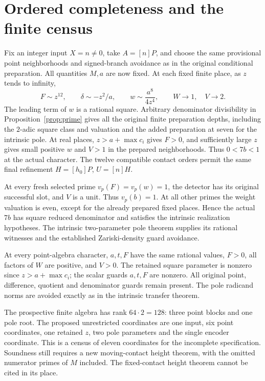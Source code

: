 \documentclass[11pt,a4paper]{article}
\begin{document}
\section{Ordered completeness and the finite census}

Fix an integer input $X=n\ne0$, take $A=[n]P$, and choose the
same provisional point neighborhoods and signed-branch avoidance
as in the original conditional preparation. All quantities $M,a$
are now fixed. At each fixed finite place, as $z$ tends to infinity,
\[
 F\sim z^{12},\qquad \delta\sim-z^2/a,\qquad
 w\sim\frac{a^8}{4z^4},\qquad W\longrightarrow1,\quad
 V\longrightarrow2.
\]
The leading term of $w$ is a rational square. Arbitrary denominator
divisibility in Proposition~\ref{prop:prime} gives all the original
finite preparation depths, including the $2$-adic square class and
valuation and the added preparation at seven for the intrinsic pole.
At real places, $z>a+\max c_i$ gives $F>0$, and sufficiently large
$z$ gives small positive $w$ and $V>1$ in the prepared neighborhoods.
Thus $0<7b<1$ at the actual character. The twelve compatible contact
orders permit the same final refinement $H=[h_0]P$, $U=[n]H$.

At every fresh selected prime $v_p(F)=v_p(w)=1$, the detector has
its original successful slot, and $V$ is a unit. Thus $v_p(b)=1$.
At all other primes the weight valuation is even, except for the
already prepared fixed places. Hence the actual $7b$ has square
reduced denominator and satisfies the intrinsic realization
hypotheses. The intrinsic two-parameter pole theorem supplies
its rational witnesses and the established Zariski-density guard
avoidance.

At every point-algebra character, $a,t,F$ have the same rational
values, $F>0$, all factors of $W$ are positive, and $V>0$.
The retained square parameter is nonzero since $z>a+\max c_i$; the scalar
guards $a,t,F$ are nonzero. All original point, difference, quotient
and denominator guards remain present. The pole radicand norms
are avoided exactly as in the intrinsic transfer theorem.

The prospective finite algebra has rank $64\cdot2=128$:
three point blocks and one pole root. The proposed
unrestricted coordinates are one input, six point coordinates, one
retained $z$, two pole parameters and the single encoder coordinate.
This is a census of eleven coordinates for the incomplete
specification. Soundness still requires a new moving-contact height
theorem, with the omitted numerator primes of $M$ included. The
fixed-contact height theorem cannot be cited in its place.
\end{document}
